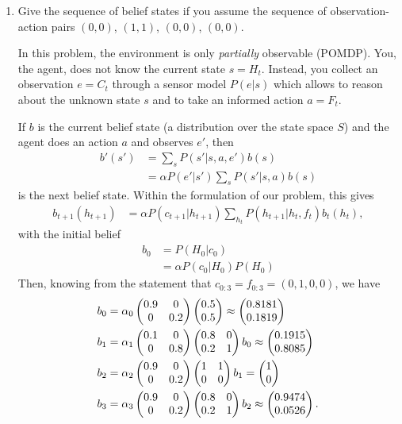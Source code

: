 \documentclass[11pt, a4paper]{article}
\begin{document}
\begin{enumerate}
    \item Give the sequence of belief states if you assume the sequence of observation-action pairs $(0, 0)$, $(1, 1)$, $(0, 0)$, $(0, 0)$.

    \begin{solution}
        In this problem, the environment is only \emph{partially} observable (POMDP). You, the agent, does not know the current state $s = H_t$. Instead, you collect an observation $e = C_t$ through a sensor model $P(e | s)$ which allows to reason about the unknown state $s$ and to take an informed action $a = F_t$.

        If $b$ is the current belief state (a distribution over the state space $S$) and the agent does an action $a$ and observes $e'$, then
        \begin{align*}
            b'(s') & = \sum_s P(s' | s, a, e') b(s) \\
            & = \alpha P(e' | s') \sum_s P(s' | s, a) b(s)
        \end{align*}
        is the next belief state. Within the formulation of our problem, this gives
        \begin{align*}
            b_{t+1}(h_{t+1}) & = \alpha P(c_{t+1} | h_{t+1}) \sum_{h_t} P(h_{t+1} | h_t, f_t) b_t(h_t),
        \end{align*}
        with the initial belief
        \begin{align*}
            b_0 & = P(H_0 | c_0) \\
            & = \alpha P(c_0 | H_0) P(H_0)
        \end{align*}
        Then, knowing from the statement that $c_{0:3} = f_{0:3} = (0, 1, 0, 0)$, we have
        \begin{align*}
            b_0 & = \alpha_0 \begin{pmatrix}0.9 & 0 \\ 0 & 0.2\end{pmatrix} \begin{pmatrix}0.5 \\ 0.5\end{pmatrix} \approx \begin{pmatrix}0.8181 \\ 0.1819\end{pmatrix} \\
            b_1 & = \alpha_1 \begin{pmatrix}0.1 & 0 \\ 0 & 0.8\end{pmatrix} \begin{pmatrix}0.8 & 0 \\ 0.2 & 1\end{pmatrix} b_0 \approx \begin{pmatrix}0.1915 \\ 0.8085\end{pmatrix} \\
            b_2 & = \alpha_2 \begin{pmatrix}0.9 & 0 \\ 0 & 0.2\end{pmatrix} \begin{pmatrix}1 & 1 \\ 0 & 0\end{pmatrix} b_1 = \begin{pmatrix}1 \\ 0\end{pmatrix} \\
            b_3 & = \alpha_3 \begin{pmatrix}0.9 & 0 \\ 0 & 0.2\end{pmatrix} \begin{pmatrix}0.8 & 0 \\ 0.2 & 1\end{pmatrix} b_2 \approx \begin{pmatrix}0.9474 \\ 0.0526\end{pmatrix} .
        \end{align*}
    \end{solution}


\end{enumerate}
\end{document}
